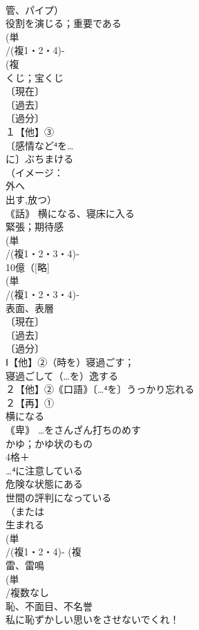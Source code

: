 \documentclass[8pt]{extreport}
\begin{document}
\begin{CJK}{UTF8}{min}
\\	管、パイプ）
\\	役割を演じる；重要である
\\	(単
\\	/(複1・2・4)-
\\	(複
\\	くじ；宝くじ 
\\	〔現在〕
\\	〔過去〕
\\	〔過分〕
\\	１【他】③
\\	〔感情など⁴を…
\\	に〕ぶちまける 
\\	（イメージ：
\\	外へ 
\\	出す,放つ）
\\	｟話｠ 横になる、寝床に入る
\\	緊張；期待感 
\\	(単
\\	/(複1・2・3・4)‐
\\	10億（[略]
\\	(単
\\	/(複1・2・3・4)‐
\\	表面、表層 
\\	〔現在〕
\\	〔過去〕
\\	〔過分〕
\\	Ⅰ【他】②（時を）寝過ごす；
\\	寝過ごして（…を）逸する 
\\	２【他】②｟口語｠〔…⁴を〕うっかり忘れる
\\	２【再】①
\\	横になる
\\	｟卑｠ …をさんざん打ちのめす 
\\	かゆ；かゆ状のもの
\\	4格＋
\\	…⁴に注意している
\\	危険な状態にある
\\	世間の評判になっている
\\	（または
\\	生まれる
\\	(単
\\	/(複1・2・4)- (複
\\	雷、雷鳴 
\\	(単
\\	/複数なし 
\\	恥、不面目、不名誉 
\\	私に恥ずかしい思いをさせないでくれ！

\end{CJK}
\end{document}
